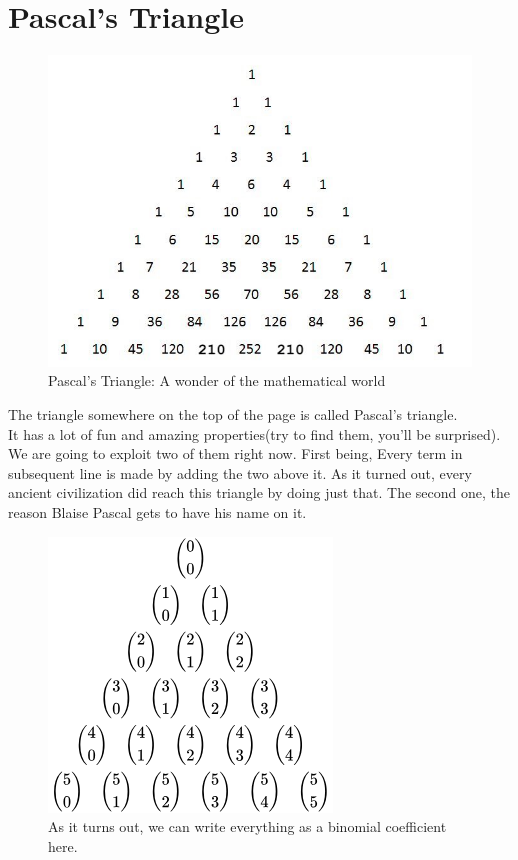 \section{Pascal's Triangle}
\begin{figure}
    \centering
    \includegraphics[width=0.75\linewidth]{Photos/Pascal's Triangle.png}
    \caption{Pascal's Triangle: A wonder of the mathematical world}    
\end{figure}
The triangle somewhere on the top of the page is called Pascal's triangle. \\
It has a lot of fun and amazing properties(try to find them, you'll be surprised).\\
We are going to exploit two of them right now. First being, Every term in subsequent line is made by adding the two above it. As it turned out, every ancient civilization did reach this triangle by doing just that. The second one, the reason Blaise Pascal gets to have his name on it.\\
\begin{figure}
    \centering
    \includegraphics[width=0.75\linewidth]{Photos/Binomial Pascal}
    \caption{As it turns out, we can write everything as a binomial coefficient here.}
\end{figure}
